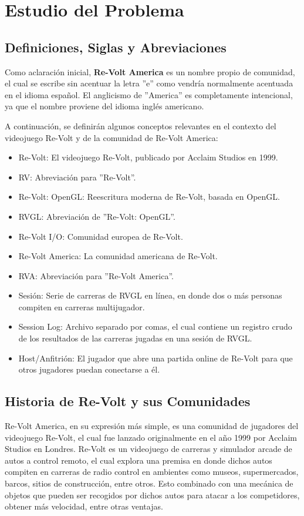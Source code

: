 \chapter{Estudio del Problema}

\section{Definiciones, Siglas y Abreviaciones}
Como aclaración inicial, \textbf{Re-Volt America} es un nombre propio de comunidad, el cual se escribe sin acentuar la letra ''e'' como vendría normalmente acentuada en el idioma español. El anglicismo de ''America'' es completamente intencional, ya que el nombre proviene del idioma inglés americano.

A continuación, se definirán algunos conceptos relevantes en el contexto del videojuego Re-Volt y de la comunidad de Re-Volt America:

\begin{itemize}
	\item Re-Volt: El videojuego Re-Volt, publicado por Acclaim Studios en 1999.
	\item RV: Abreviación para ''Re-Volt''.
	\item Re-Volt: OpenGL: Reescritura moderna de Re-Volt, basada en OpenGL.
	\item RVGL: Abreviación de ''Re-Volt: OpenGL''.
	\item Re-Volt I/O: Comunidad europea de Re-Volt.
	\item Re-Volt America: La comunidad americana de Re-Volt.
	\item RVA: Abreviación para ''Re-Volt America''.
	\item Sesión: Serie de carreras de RVGL en línea, en donde dos o más personas compiten en carreras multijugador.
	\item Session Log: Archivo separado por comas, el cual contiene un registro crudo de los resultados de las carreras jugadas en una sesión de RVGL.
 	\item Host/Anfitrión: El jugador que abre una partida online de Re-Volt para que otros jugadores puedan conectarse a él.
\end{itemize}

\section{Historia de Re-Volt y sus Comunidades}
Re-Volt America, en su expresión más simple, es una comunidad de jugadores del videojuego Re-Volt, el cual fue lanzado originalmente en el año 1999 por Acclaim Studios en Londres. Re-Volt es un videojuego de carreras y simulador arcade de autos a control remoto, el cual explora una premisa en donde dichos autos compiten en carreras de radio control en ambientes como museos, supermercados, barcos, sitios de construcción, entre otros. Esto combinado con una mecánica de objetos que pueden ser recogidos por dichos autos para atacar a los competidores, obtener más velocidad, entre otras ventajas.

